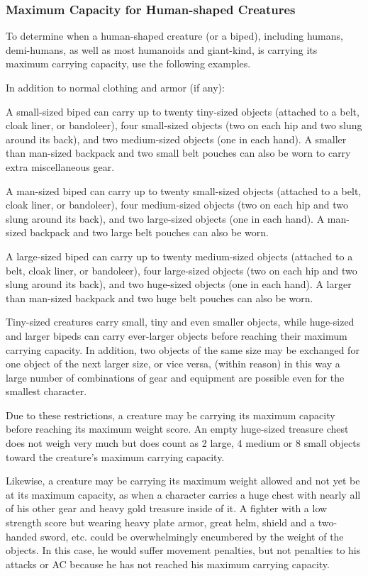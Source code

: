 \begin{multicols}{2}
\subsubsection*{Maximum Capacity for Human-shaped Creatures}

To determine when a human-shaped creature (or a biped), including humans, demi-humans, as well as most humanoids and giant-kind, is carrying its maximum carrying capacity, use the following examples.  

In addition to normal clothing and armor (if any):

A small-sized biped can carry up to twenty tiny-sized objects (attached to a belt, cloak liner, or bandoleer), four small-sized objects (two on each hip and two slung around its back), and two medium-sized objects (one in each hand).  A smaller than man-sized backpack and two small belt pouches can also be worn to carry extra miscellaneous gear.  

A man-sized biped can carry up to twenty small-sized objects (attached to a belt, cloak liner, or bandoleer), four medium-sized objects (two on each hip and two slung around its back), and two large-sized objects (one in each hand).  A man-sized backpack and two large belt pouches can also be worn.  

A large-sized biped can carry up to twenty medium-sized objects (attached to a belt, cloak liner, or bandoleer), four large-sized objects (two on each hip and two slung around its back), and two huge-sized objects (one in each hand).  A larger than man-sized backpack and two huge belt pouches can also be worn.  

Tiny-sized creatures carry small, tiny and even smaller objects, while huge-sized and larger bipeds can carry ever-larger objects before reaching their maximum carrying capacity.  In addition, two objects of the same size may be exchanged for one object of the next larger size, or vice versa, (within reason) in this way a large number of combinations of gear and equipment are possible even for the smallest character.

Due to these restrictions, a creature may be carrying its maximum capacity before reaching its maximum weight score.  An empty huge-sized treasure chest does not weigh very much but does count as 2 large, 4 medium or 8 small objects toward the creature's maximum carrying capacity.  

Likewise, a creature may be carrying its maximum weight allowed and not yet be at its maximum capacity, as when a character carries a huge chest with nearly all of his other gear and heavy gold treasure inside of it.  A fighter with a low strength score but wearing heavy plate armor, great helm, shield and a two-handed sword, etc. could be overwhelmingly encumbered by the weight of the objects.  In this case, he would suffer movement penalties, but not penalties to his attacks or AC because he has not reached his maximum carrying capacity.


\end{multicols}
